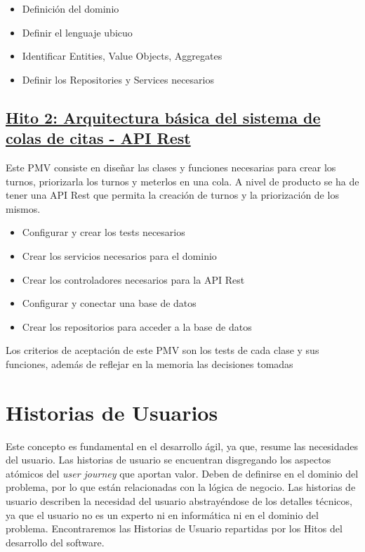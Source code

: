 \begin{itemize}
    \item {Definición del dominio}
    \item {Definir el lenguaje ubicuo}
    \item {Identificar Entities, Value Objects, Aggregates}
    \item {Definir los Repositories y Services necesarios}
\end{itemize}


\subsection*{\href{https://github.com/RubenDelgadoPareja/TFG-Triage-Inteligente-Consulta-Medica/milestone/2}{Hito 2: Arquitectura básica del sistema de colas de citas - API Rest}}

Este PMV consiste en diseñar las clases y funciones necesarias para crear los turnos, priorizarla los turnos y meterlos en una cola.
A nivel de producto se ha de tener una API Rest que permita la creación de turnos y la priorización de los mismos.

\begin{itemize}
    \item {Configurar y crear los tests necesarios}
    \item {Crear los servicios necesarios para el dominio}
    \item {Crear los controladores necesarios para la API Rest}
    \item {Configurar y conectar una base de datos}
    \item {Crear los repositorios para acceder a la base de datos}
\end{itemize}

Los criterios de aceptación de este PMV son los tests de cada clase y sus funciones, además de reflejar en la memoria las decisiones tomadas

\section{Historias de Usuarios}
Este concepto es fundamental en el desarrollo ágil, ya que, resume las necesidades del usuario.
Las historias de usuario se encuentran disgregando los aspectos atómicos del \textit{user journey} que aportan valor.
Deben de definirse en el dominio del problema, por lo que están relacionadas con la lógica de negocio.
Las historias de usuario describen la necesidad del usuario abstrayéndose de los detalles técnicos, ya que
el usuario no es un experto ni en informática ni en el dominio del problema.
Encontraremos las Historias de Usuario repartidas por los Hitos del desarrollo del software.


